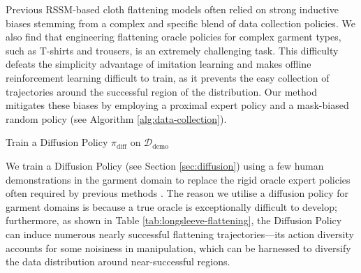 \documentclass[journal]{IEEEtran}
\newcommand{\addIncrementalg}[1]{\textcolor{mygreen}{#1}}
\begin{document}
Previous RSSM-based cloth flattening models \cite{kadi2024planet} often relied on strong inductive biases stemming from a complex and specific blend of data collection policies. We also find that engineering flattening oracle policies for complex garment types, such as T-shirts and trousers, is an extremely challenging task. This difficulty defeats the simplicity advantage of imitation learning and makes offline reinforcement learning difficult to train, as it prevents the easy collection of trajectories around the successful region of the distribution. Our  method mitigates these biases by employing a  \addIncrementalg{proximal expert policy} and a mask-biased random policy (see Algorithm \ref{alg:data-collection}). 

\begin{algorithm}[t]
\caption{Data Collection with Diffusion and Random Policies for Offline Reinforcement Learning}
\label{alg:data-collection}
\LinesNumbered 
{}

\BlankLine

Train a Diffusion Policy $\pi_{\text{diff}}$ on $\mathcal{D}_{\text{demo}}$ \;

\BlankLine
{}
\BlankLine
{}
\end{algorithm}

We train a Diffusion Policy \cite{chi2023diffusionpolicy} (see Section \ref{sec:diffusion}) using a few human demonstrations in the garment domain to replace the rigid oracle expert policies often required by previous methods \cite{kadi2024planet}. \addIncrementalg{The reason we utilise a diffusion policy for garment domains is because a true oracle is exceptionally difficult to develop; furthermore, as shown in Table \ref{tab:longsleeve-flattening}, the Diffusion Policy can induce numerous nearly successful flattening trajectories---its action diversity accounts for some noisiness in manipulation, which can be harnessed to diversify the data distribution around near-successful regions. }
\end{document}
